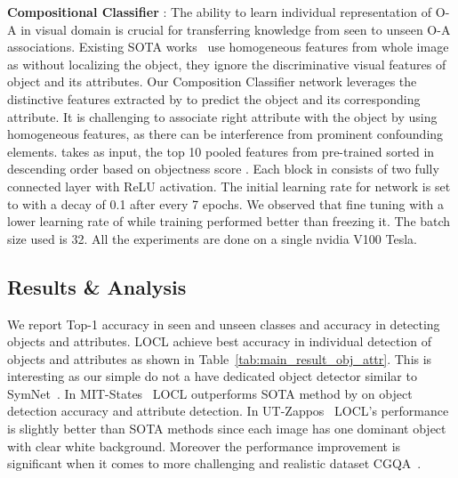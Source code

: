 \documentclass{bmvc2k}
\begin{document}
\textbf{Compositional Classifier} : The ability to learn individual representation of O-A in visual domain is crucial for transferring knowledge from seen to unseen O-A associations. Existing SOTA works~\cite{naeem2021learning,mancini2021learning,mancini2021open,ruis2021independent,xu2021zero} use homogeneous features from whole image as without localizing the object, they ignore the discriminative visual features of object and its attributes. Our Composition Classifier network  leverages the distinctive features extracted by  to predict the object and its corresponding attribute.
It is challenging to associate right attribute with the object by using homogeneous features, as there can be interference from prominent confounding elements.
 takes as input, the top 10 pooled features  from pre-trained  sorted in descending order based on objectness score . Each block in  consists of two fully connected layer with ReLU activation. The initial learning rate for  network is set to  with a decay of 0.1 after every 7 epochs. We observed that fine tuning  with a lower learning rate of  while training   performed better than freezing it. The batch size used is 32. All the experiments are done on a single nvidia V100 Tesla.

\subsection{Results \& Analysis}

We report Top-1 accuracy in seen and unseen classes and accuracy in detecting objects and attributes. LOCL achieve best accuracy in individual detection of objects and attributes as shown in Table~\ref{tab:main_result_obj_attr}. This is interesting as our simple  do not a have dedicated object detector similar to SymNet~\cite{li2020symmetry}.
In MIT-States~\cite{isola2015discovering} LOCL outperforms SOTA method by  on object detection accuracy and  attribute detection. 
In UT-Zappos~\cite{yu2017semantic} LOCL's performance is slightly better than SOTA methods since each image has one dominant object with clear white background. Moreover the performance improvement is significant when it comes to more challenging and realistic dataset CGQA~\cite{naeem2021learning}. 
\end{document}
